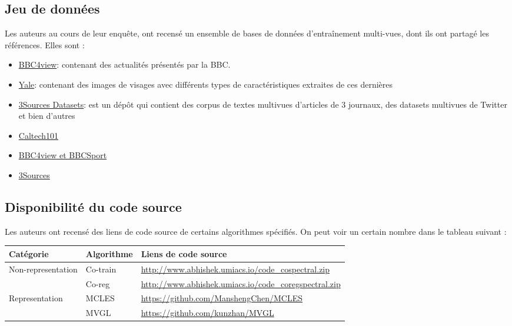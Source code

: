 \documentclass[12pt, french, latin.medieval, a4paper]{report}
\begin{document}
    	\subsection{Jeu de données}
        	Les auteurs au cours de leur enquête, ont recensé un ensemble de bases de données d'entraînement multi-vues, dont ils ont partagé les références. Elles sont :
        	\begin{itemize}
            	\item \href{http://mlg.ucd.ie/datasets/segment.html}{BBC4view}: contenant des actualités présentés par la BBC.
            	\item \href{http://cvc.yale.edu/projects/yalefaces/yalefaces.html}{Yale}:  contenant des images de visages avec différents types de caractéristiques extraites de ces dernières
            	\item \href{http://mlg.ucd.ie/datasets/bbc.html}{3Sources Datasets}: est un dépôt qui contient des corpus de textes multivues d'articles de 3 journaux, des datasets multivues de Twitter et bien d'autres
            	\item \href{http://www.vision.caltech.edu/Image_Datasets/Caltech101}{Caltech101}
            	\item \href{http://mlg.ucd.ie/datasets/segment.html}{BBC4view et BBCSport}
            	\item \href{http://mlg.ucd.ie/datasets/3sources.html}{3Sources}
        	\end{itemize}
   	 
    	\subsection{Disponibilité du code source}
        	Les auteurs ont recensé des liens de code source de certains algorithmes spécifiés.
        	On peut voir un certain nombre dans le tableau suivant :
        	\begin{center}
            	\begin{longtable}{|p{3cm}|p{2cm}|p{9.5cm}|}
            	\hline
            	{Catégorie} & {Algorithme} & {Liens de code source} \\
            	\hline
                	Non-representation & Co-train & \href{http://www.abhishek.umiacs.io/code_cospectral.zip}{http://www.abhishek.umiacs.io/code_cospectral.zip}\\
                	& Co-reg &  \href{http://www.abhishek.umiacs.io/code_coregspectral.zip}{http://www.abhishek.umiacs.io/code_coregspectral.zip}\\
                	Representation & MCLES & \href{https://github.com/ManshengChen/MCLES}{https://github.com/ManshengChen/MCLES}\\
                	& MVGL & \href{https://github.com/kunzhan/MVGL}{https://github.com/kunzhan/MVGL}
            	\hline
        	\end{longtable}
        	\end{center}
       	 
\end{document}
